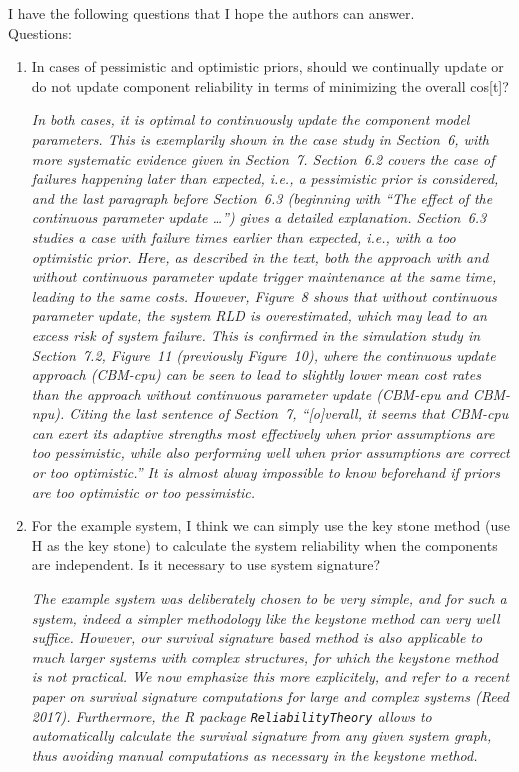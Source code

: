 \documentclass[authoryear]{elsarticle}
\begin{document}
I have the following questions that I hope the authors can answer.\\
Questions:
\begin{enumerate}
\item In cases of pessimistic and optimistic priors, should we continually update or do not update component reliability in terms of minimizing the overall cos[t]?

\smallskip

\emph{In both cases, it is optimal to continuously update the component model parameters.
This is exemplarily shown in the case study in Section~6, with more systematic evidence given in Section~7.
Section~6.2 covers the case of failures happening later than expected, i.e., a pessimistic prior is considered,
and the last paragraph before Section~6.3 (beginning with ``The effect of the continuous parameter update \ldots'')
gives a detailed explanation.
Section~6.3 studies a case with failure times earlier than expected, i.e., with a too optimistic prior.
Here, as described in the text, both the approach with and without continuous parameter update
trigger maintenance at the same time, leading to the same costs.
However, Figure~8 shows that without continuous parameter update, the system RLD is overestimated,
which may lead to an excess risk of system failure.
This is confirmed in the simulation study in Section~7.2, Figure~11 (previously Figure~10),
where the continuous update approach (CBM-cpu) can be seen to lead to slightly lower mean cost rates
than the approach without continuous parameter update (CBM-epu and CBM-npu).
Citing the last sentence of Section~7,
``[o]verall, it seems that CBM-cpu can exert its adaptive strengths most effectively
when prior assumptions are too pessimistic,
while also performing well when prior assumptions are correct or too optimistic.''
It is almost alway impossible to know beforehand if priors are too optimistic or too pessimistic.}

\item For the example system, I think we can simply use the key stone method (use H as the key stone) to calculate the system reliability when the components are independent.  Is it necessary to use system signature? 

\smallskip

\emph{The example system was deliberately chosen to be very simple,
and for such a system, indeed a simpler methodology like the keystone method can very well suffice.
However, our survival signature based method is also applicable to much larger systems with complex structures,
for which the keystone method is not practical.
We now emphasize this more explicitely,
and refer to a recent paper on survival signature computations for large and complex systems (Reed 2017).
Furthermore, the \textsf{R} package \texttt{ReliabilityTheory} allows to automatically calculate the
survival signature from any given system graph,
thus avoiding manual computations as necessary in the keystone method.}
\end{enumerate}
\end{document}

